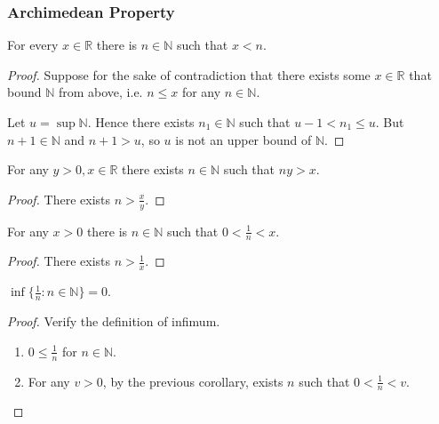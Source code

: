 \subsubsection{Archimedean Property}

\begin{theorem}
	For every $x \in \mathbb{R}$ there is $n \in  \mathbb{N}$ such that $x<n$.
\end{theorem}
\begin{proof}
Suppose for the sake of contradiction that there exists some $x \in \mathbb{R}$ that bound $\mathbb{N}$ from above, i.e. $n\le x$ for any $n \in  \mathbb{N}$.

Let $u = \operatorname{sup} \mathbb{N}$. Hence there exists $n_1 \in \mathbb{N}$ such that $u -1 < n_1\le u$. But $n+1 \in \mathbb{N}$ and $n+1 > u$, so  $u$ is not an upper bound of  $\mathbb{N}$.
\end{proof}

\begin{corollary}
	For any $y>0, x \in \mathbb{R}$ there exists $n \in \mathbb{N}$ such that $ny>x$.
\end{corollary}
\begin{proof}
There exists $n > \frac{x}{y}$.
\end{proof}

\begin{corollary}
	For any $x>0$ there is $n \in \mathbb{N}$ such that $0<\frac{1}{n}<x$.
\end{corollary}
\begin{proof}
There exists $n>\frac{1}{x}$.
\end{proof}

\begin{corollary}
	$\operatorname{inf} \{\frac{1}{n}:n \in \mathbb{N}\} =0$.
\end{corollary}
\begin{proof}
Verify the definition of infimum.
\begin{enumerate}
	\item $0\le \frac{1}{n}$ for $n \in \mathbb{N}$.
	\item For any $v>0$, by the previous corollary,
		exists  $n$ such that  $0<\frac{1}{n}<v$.
\end{enumerate}
\end{proof}


